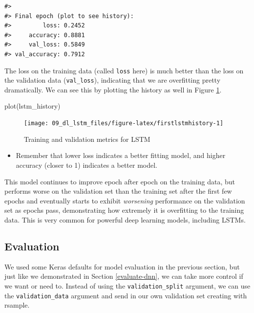 \documentclass[
]{krantz}
\makeatletter
\newenvironment{Shaded}{\begin{snugshade}}{\end{snugshade}}
\newcommand{\FunctionTok}[1]{\textcolor[rgb]{0.00,0.00,0.00}{#1}}
\newcommand{\NormalTok}[1]{#1}
\newenvironment{kframe}{%
\medskip{}
\setlength{\fboxsep}{.8em}
 \def\at@end@of@kframe{}%
 \ifinner\ifhmode%
  \def\at@end@of@kframe{\end{minipage}}%
  \begin{minipage}{\columnwidth}%
 \fi\fi%
 \def\FrameCommand##1{\hskip\@totalleftmargin \hskip-\fboxsep
 \colorbox{shadecolor}{##1}\hskip-\fboxsep
     \hskip-\linewidth \hskip-\@totalleftmargin \hskip\columnwidth}%
 \MakeFramed {\advance\hsize-\width
   \@totalleftmargin\z@ \linewidth\hsize
   \@setminipage}}%
 {\par\unskip\endMakeFramed%
 \at@end@of@kframe}
\renewenvironment{Shaded}{\begin{kframe}}{\end{kframe}}
\newenvironment{rmdblock}[1]
  {\begin{shaded*}
  \begin{itemize}[left = -1cm, labelsep = 1cm]
  \renewcommand{\labelitemi}{
    \raisebox{-.7\height}[0pt][0pt]{
      {\setkeys{Gin}{width=3em,keepaspectratio}\texttt{[image: images/\#1]}}
    }
  }
 
  \item
  }
  {
  \end{itemize}
  \end{shaded*}
  }
\newenvironment{rmdnote}
  {\begin{rmdblock}{note}}
  {\end{rmdblock}}
\makeatother
\begin{document}
\begin{verbatim}
#> 
#> Final epoch (plot to see history):
#>         loss: 0.2452
#>     accuracy: 0.8881
#>     val_loss: 0.5849
#> val_accuracy: 0.7912
\end{verbatim}

The loss on the training data (called \texttt{loss} here) is much better than the loss on the validation data (\texttt{val\_loss}), indicating that we are overfitting pretty dramatically. We can see this by plotting the history as well in Figure \ref{fig:firstlstmhistory}.

\begin{Shaded}
\begin{Highlighting}[]
\FunctionTok{plot}\NormalTok{(lstm\_history)}
\end{Highlighting}
\end{Shaded}

\begin{figure}

{\centering \texttt{[image: 09\_dl\_lstm\_files/figure-latex/firstlstmhistory-1]} 

}

\caption{Training and validation metrics for LSTM}\label{fig:firstlstmhistory}
\end{figure}

\begin{rmdnote}
Remember that lower loss indicates a better fitting model, and higher
accuracy (closer to 1) indicates a better model.
\end{rmdnote}

This model continues to improve epoch after epoch on the training data, but performs worse on the validation set than the training set after the first few epochs and eventually starts to exhibit \emph{worsening} performance on the validation set as epochs pass, demonstrating how extremely it is overfitting to the training data. This is very common for powerful deep learning models, including LSTMs.

\hypertarget{lstmevaluation}{%
\subsection{Evaluation}\label{lstmevaluation}}

We used some Keras defaults for model evaluation in the previous section, but just like we demonstrated in Section \ref{evaluate-dnn}, we can take more control if we want or need to. Instead of using the \texttt{validation\_split} argument, we can use the \texttt{validation\_data} argument and send in our own validation set creating with rsample.
\end{document}
